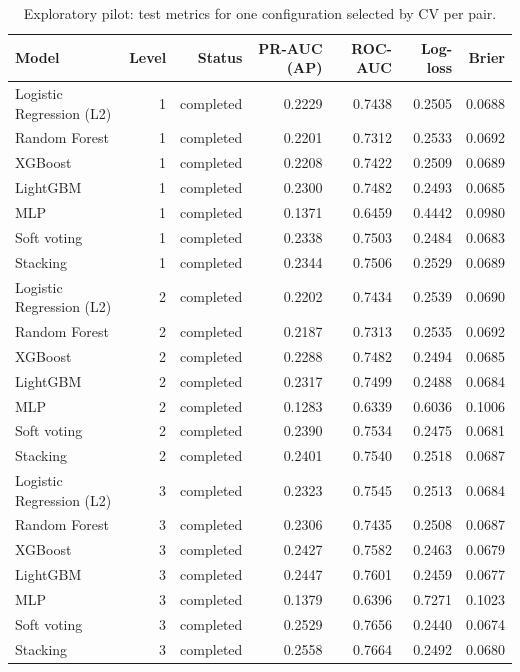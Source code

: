 \begin{table}[htbp]
\centering
\small
\caption{Exploratory pilot: test metrics for one configuration selected by CV per pair.}
\label{tab:pilot-metrics}
\begin{tabular}{lrrrrrr}
\toprule
Model & Level & Status & PR-AUC (AP) & ROC-AUC & Log-loss & Brier \\
\midrule
Logistic Regression (L2) & 1 & completed & 0.2229 & 0.7438 & 0.2505 & 0.0688 \\
Random Forest & 1 & completed & 0.2201 & 0.7312 & 0.2533 & 0.0692 \\
XGBoost & 1 & completed & 0.2208 & 0.7422 & 0.2509 & 0.0689 \\
LightGBM & 1 & completed & 0.2300 & 0.7482 & 0.2493 & 0.0685 \\
MLP & 1 & completed & 0.1371 & 0.6459 & 0.4442 & 0.0980 \\
Soft voting & 1 & completed & 0.2338 & 0.7503 & 0.2484 & 0.0683 \\
Stacking & 1 & completed & 0.2344 & 0.7506 & 0.2529 & 0.0689 \\
Logistic Regression (L2) & 2 & completed & 0.2202 & 0.7434 & 0.2539 & 0.0690 \\
Random Forest & 2 & completed & 0.2187 & 0.7313 & 0.2535 & 0.0692 \\
XGBoost & 2 & completed & 0.2288 & 0.7482 & 0.2494 & 0.0685 \\
LightGBM & 2 & completed & 0.2317 & 0.7499 & 0.2488 & 0.0684 \\
MLP & 2 & completed & 0.1283 & 0.6339 & 0.6036 & 0.1006 \\
Soft voting & 2 & completed & 0.2390 & 0.7534 & 0.2475 & 0.0681 \\
Stacking & 2 & completed & 0.2401 & 0.7540 & 0.2518 & 0.0687 \\
Logistic Regression (L2) & 3 & completed & 0.2323 & 0.7545 & 0.2513 & 0.0684 \\
Random Forest & 3 & completed & 0.2306 & 0.7435 & 0.2508 & 0.0687 \\
XGBoost & 3 & completed & 0.2427 & 0.7582 & 0.2463 & 0.0679 \\
LightGBM & 3 & completed & 0.2447 & 0.7601 & 0.2459 & 0.0677 \\
MLP & 3 & completed & 0.1379 & 0.6396 & 0.7271 & 0.1023 \\
Soft voting & 3 & completed & 0.2529 & 0.7656 & 0.2440 & 0.0674 \\
Stacking & 3 & completed & 0.2558 & 0.7664 & 0.2492 & 0.0680 \\

\end{tabular}
\end{table}
